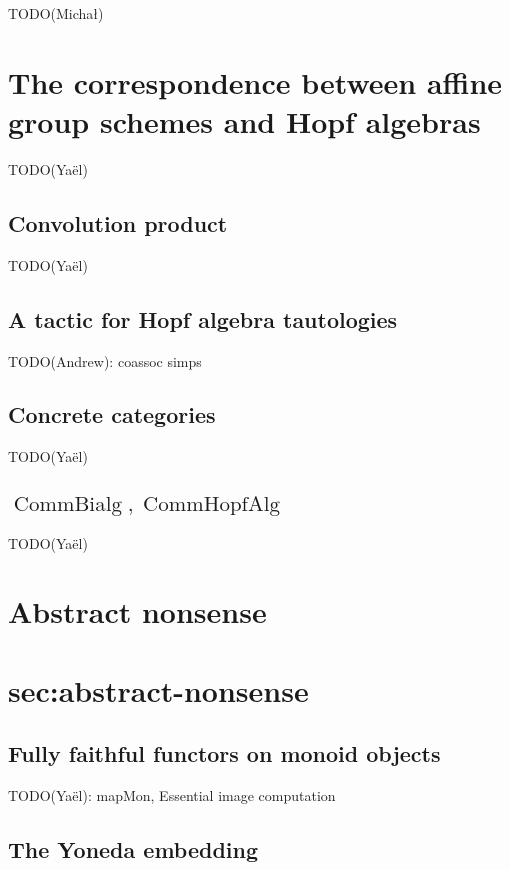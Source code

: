 \documentclass{article}
\DeclareMathOperator{\CommBialg}{CommBialg}
\DeclareMathOperator{\CommHopfAlg}{CommHopfAlg}
\begin{document}
TODO(Michał)



\section{The correspondence between affine group schemes and Hopf algebras}


TODO(Yaël)


\subsection{Convolution product}\label{sec:conv-prod}


TODO(Yaël)


\subsection{A tactic for Hopf algebra tautologies}\label{sec:coassoc-simps}


TODO(Andrew): coassoc simps


\subsection{Concrete categories}\label{sec:concrete-categories}


TODO(Yaël)


\subsection{\texorpdfstring{$\CommBialg, \CommHopfAlg$}{CommBialg, CommHopfAlg}}\label{sec:comm-hopf-alg}


TODO(Yaël)



\section{Abstract nonsense}\section{sec:abstract-nonsense}


\subsection{Fully faithful functors on monoid objects}


TODO(Yaël): mapMon, Essential image computation


\subsection{The Yoneda embedding}
\end{document}
